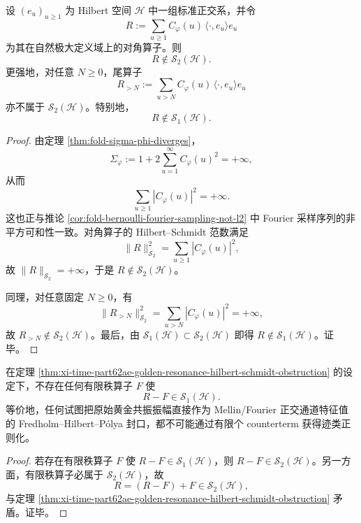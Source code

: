 \begin{theorem}\label{thm:xi-time-part62ae-golden-resonance-hilbert-schmidt-obstruction}
设 \((e_u)_{u\ge 1}\) 为 Hilbert 空间 \(\mathcal H\) 中一组标准正交系，并令
\[
R
:=
\sum_{u\ge 1}C_\varphi(u)\,\langle\cdot,e_u\rangle e_u
\]
为其在自然极大定义域上的对角算子。则
\[
R\notin \mathcal S_2(\mathcal H).
\]
更强地，对任意 \(N\ge 0\)，尾算子
\[
R_{>N}
:=
\sum_{u>N}C_\varphi(u)\,\langle\cdot,e_u\rangle e_u
\]
亦不属于 \(\mathcal S_2(\mathcal H)\)。特别地，
\[
R\notin \mathcal S_1(\mathcal H).
\]
\end{theorem}
\begin{proof}
由定理 \ref{thm:fold-sigma-phi-diverges}，
\[
\Sigma_\varphi
:=
1+2\sum_{u=1}^{\infty}C_\varphi(u)^2
=+\infty,
\]
从而
\[
\sum_{u\ge 1}|C_\varphi(u)|^2=+\infty.
\]
这也正与推论 \ref{cor:fold-bernoulli-fourier-sampling-not-l2} 中 Fourier 采样序列的非平方可和性一致。对角算子的 Hilbert--Schmidt 范数满足
\[
\|R\|_{\mathcal S_2}^2
=
\sum_{u\ge 1}|C_\varphi(u)|^2,
\]
故 \(\|R\|_{\mathcal S_2}=+\infty\)，于是 \(R\notin\mathcal S_2(\mathcal H)\)。

同理，对任意固定 \(N\ge 0\)，有
\[
\|R_{>N}\|_{\mathcal S_2}^2
=
\sum_{u>N}|C_\varphi(u)|^2
=+\infty,
\]
故 \(R_{>N}\notin \mathcal S_2(\mathcal H)\)。最后，由 \(\mathcal S_1(\mathcal H)\subset \mathcal S_2(\mathcal H)\) 即得 \(R\notin \mathcal S_1(\mathcal H)\)。证毕。
\end{proof}

\begin{corollary}\label{cor:xi-time-part62ae-no-finite-counterterm-fredholm-closure}
在定理 \ref{thm:xi-time-part62ae-golden-resonance-hilbert-schmidt-obstruction} 的设定下，不存在任何有限秩算子 \(F\) 使
\[
R-F\in \mathcal S_1(\mathcal H).
\]
等价地，任何试图把原始黄金共振振幅直接作为 Mellin/Fourier 正交通道特征值的 Fredholm--Hilbert--P\'olya 封口，都不可能通过有限个 counterterm 获得迹类正则化。
\end{corollary}
\begin{proof}
若存在有限秩算子 \(F\) 使 \(R-F\in\mathcal S_1(\mathcal H)\)，则 \(R-F\in\mathcal S_2(\mathcal H)\)。另一方面，有限秩算子必属于 \(\mathcal S_2(\mathcal H)\)，故
\[
R=(R-F)+F\in\mathcal S_2(\mathcal H),
\]
与定理 \ref{thm:xi-time-part62ae-golden-resonance-hilbert-schmidt-obstruction} 矛盾。证毕。
\end{proof}


